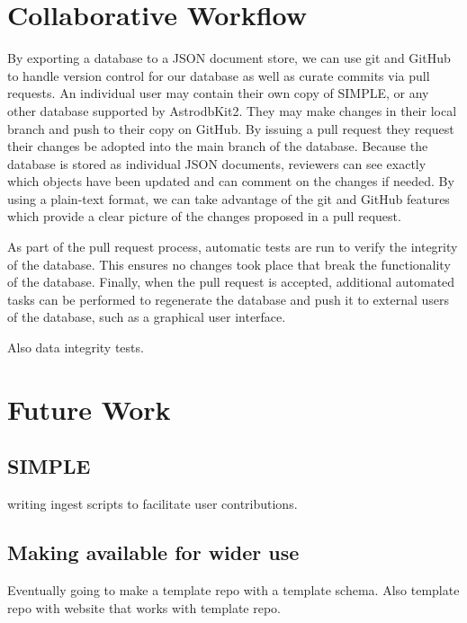 \documentclass[11pt,twoside]{article}
\begin{document}
\section{Collaborative Workflow}

By exporting a database to a JSON document store, we can use git and GitHub to handle version control for our database as well as curate commits via pull requests. 
An individual user may contain their own copy of SIMPLE, or any other database supported by AstrodbKit2. They may make changes in their local branch and push to their copy on GitHub. By issuing a pull request they request their changes be adopted into the main branch of the database. Because the database is stored as individual JSON documents, reviewers can see exactly which objects have been updated and can comment on the changes if needed. By using a plain-text format, we can take advantage of the git and GitHub features which provide a clear picture of the changes proposed in a pull request. 

As part of the pull request process, automatic tests are run to verify the integrity of the database. This ensures no changes took place that break the functionality of the database. Finally, when the pull request is accepted, additional automated tasks can be performed to regenerate the database and push it to external users of the database, such as a graphical user interface.

Also data integrity tests.

\section{Future Work}
\subsection{SIMPLE}
writing ingest scripts to facilitate user contributions.

\subsection{Making available for wider use}
Eventually going to make a template repo with a template schema. Also template repo with website that works with template repo.
\end{document}
